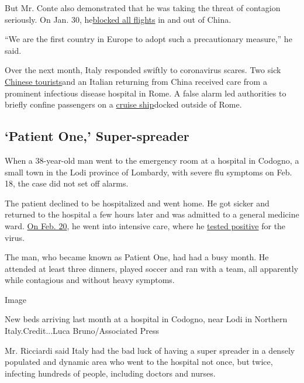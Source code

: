 But Mr. Conte also demonstrated that he was taking the threat of
contagion seriously. On Jan. 30,
he\href{https://www.nytimes3xbfgragh.onion/2020/01/30/world/asia/coronavirus-china.html?searchResultPosition=16}{blocked
all flights} in and out of China.

``We are the first country in Europe to adopt such a precautionary
measure,'' he said.

Over the next month, Italy responded swiftly to coronavirus scares. Two
sick
\href{https://www.nytimes3xbfgragh.onion/2020/01/31/world/asia/coronavirus-china.html?searchResultPosition=22}{Chinese
tourists}and an Italian returning from China received care from a
prominent infectious disease hospital in Rome. A false alarm led
authorities to briefly confine passengers on a
\href{https://www.nytimes3xbfgragh.onion/2020/01/30/world/europe/italy-coronavirus-cruise.html?searchResultPosition=56}{cruise
ship}docked outside of Rome.

\hypertarget{patient-one-super-spreader}{%
\subsection{`Patient One,'
Super-spreader}\label{patient-one-super-spreader}}

When a 38-year-old man went to the emergency room at a hospital in
Codogno, a small town in the Lodi province of Lombardy, with severe flu
symptoms on Feb. 18, the case did not set off alarms.

The patient declined to be hospitalized and went home. He got sicker and
returned to the hospital a few hours later and was admitted to a general
medicine ward.
\href{https://www.repubblica.it/cronaca/2020/03/06/news/l_anestesista_di_codogno_per_mattia_era_tutto_inutile_cosi_ho_avuto_la_folle_idea_di_pensare_al_coronavirus_-250380291/}{On
Feb. 20}, he went into intensive care, where he
\href{https://www.nytimes3xbfgragh.onion/2020/02/21/world/asia/china-coronavirus.html?searchResultPosition=4}{tested
positive} for the virus.

The man, who became known as Patient One, had had a busy month. He
attended at least three dinners, played soccer and ran with a team, all
apparently while contagious and without heavy symptoms.

Image

New beds arriving last month at a hospital in Codogno, near Lodi in
Northern Italy.Credit...Luca Bruno/Associated Press

Mr. Ricciardi said Italy had the bad luck of having a super spreader in
a densely populated and dynamic area who went to the hospital not once,
but twice, infecting hundreds of people, including doctors and nurses.

